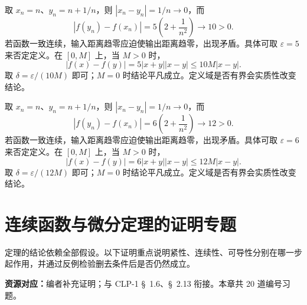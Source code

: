 \documentclass[12pt,fontset=fandol]{ctexart}
\begin{document}
\begin{solve}\label{ans:c6q23}
取 $x_n=n$、$y_n=n+1/n$，则 $|x_n-y_n|=1/n\to0$，而
\[
|f(y_n)-f(x_n)|=5\left(2+\frac1{n^2}\right)\longrightarrow 10>0.
\]
若函数一致连续，输入距离趋零应迫使输出距离趋零，出现矛盾。具体可取 $\varepsilon=5$ 来否定定义。在 $[0,M]$ 上，当 $M>0$ 时，
\[
|f(x)-f(y)|=5|x+y||x-y|\le 10M|x-y|.
\]
取 $\delta=\varepsilon/(10M)$ 即可；$M=0$ 时结论平凡成立。定义域是否有界会实质性改变结论。
\end{solve}

\begin{solve}\label{ans:c6q24}
取 $x_n=n$、$y_n=n+1/n$，则 $|x_n-y_n|=1/n\to0$，而
\[
|f(y_n)-f(x_n)|=6\left(2+\frac1{n^2}\right)\longrightarrow 12>0.
\]
若函数一致连续，输入距离趋零应迫使输出距离趋零，出现矛盾。具体可取 $\varepsilon=6$ 来否定定义。在 $[0,M]$ 上，当 $M>0$ 时，
\[
|f(x)-f(y)|=6|x+y||x-y|\le 12M|x-y|.
\]
取 $\delta=\varepsilon/(12M)$ 即可；$M=0$ 时结论平凡成立。定义域是否有界会实质性改变结论。
\end{solve}

\clearpage
\section{连续函数与微分定理的证明专题}\label{sec:ch7}
定理的结论依赖全部假设。以下证明重点说明紧性、连续性、可导性分别在哪一步起作用，并通过反例检验删去条件后是否仍然成立。

\textbf{资源对应：}编者补充证明；与 CLP-1 \S~1.6、\S~2.13 衔接。本章共 20 道编号习题。
\end{document}
